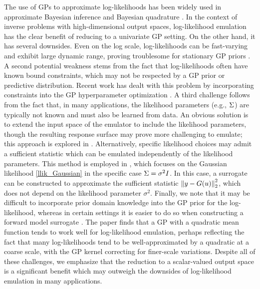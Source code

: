 \documentclass[12pt]{article}
\begin{document}
The use of GPs to approximate log-likelihoods has been widely used in approximate Bayesian inference 
\citep{VehtariParallelGP, Kandasamy_2017, llikRBF, trainDynamics, quantileApprox, wang2018adaptive, landslideCalibration}
and Bayesian quadrature \citep{BayesQuadrature, BayesQuadRatios}. In the context of inverse problems with 
high-dimensional output spaces, log-likelihood emulation has the clear benefit of reducing to a univariate GP setting. 
On the other hand, it has several downsides. Even on the log scale, log-likelihoods can be fast-varying and exhibit large 
dynamic range, proving troublesome for stationary GP priors \cite{wang2018adaptive}. A second potential weakness 
stems from the fact that log-likelihoods often have known bound constraints, which may not be respected by a GP 
prior or predictive distribution. Recent work has dealt with this problem by incorporating constraints into the 
GP hyperparameter optimization \cite{quantileApprox}. A third challenge follows from the fact that, in many applications, 
the likelihood parameters (e.g., $\Sigma$) are typically not known and must also be learned from data. An obvious 
solution is to extend the input space of the emulator to include the likelihood parameters, though the resulting response surface 
may prove more challenging to emulate; this approach is explored in \cite{llikRBF}. Alternatively, specific likelihood 
choices may admit a sufficient statistic which can be emulated independently of the likelihood parameters. This method is employed 
in \cite{FerEmulation}, which focuses on the Gaussian likelihood \ref{llik_Gaussian} in the specific case $\Sigma = \sigma^2 I$. In this 
case, a surrogate can be constructed to approximate the sufficient statistic $\left\lVert y - G(u)\right\rVert_2^2$, 
which does not depend on the likelihood parameter $\sigma^2$. 
Finally, we note that it may be difficult to incorporate prior domain knowledge 
into the GP prior for the log-likelihood, whereas in certain settings it is easier to do so when constructing a forward model 
surrogate \cite{GP_PDE_priors}. The paper \cite{VehtariParallelGP} finds that a GP with a quadratic mean function tends to 
work well for log-likelihood emulation, perhaps reflecting the fact that many log-likelihoods tend to be well-approximated by 
a quadratic at a coarse scale, with the GP kernel correcting for finer-scale variations. 
Despite all of these challenges, we emphasize that the reduction to a scalar-valued output space is a significant benefit which 
may outweigh the downsides of log-likelihood emulation in many applications. 
\end{document}
